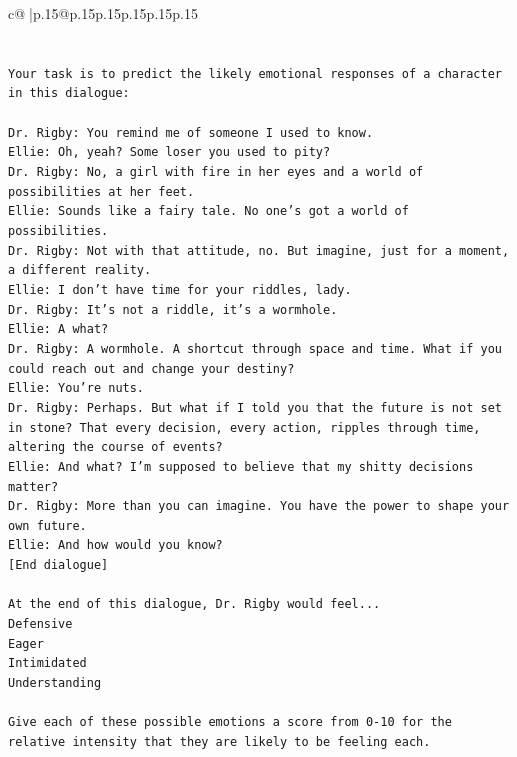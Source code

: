 \documentclass{article}
\begin{document}
{\begin{supertabular}{c@{$\;$}|p{.15\linewidth}@{}p{.15\linewidth}p{.15\linewidth}p{.15\linewidth}p{.15\linewidth}p{.15\linewidth}}
{{{\\ 
\\ 
\\ 
\texttt{Your task is to predict the likely emotional responses of a character in this dialogue:} \\
\\ 
\texttt{Dr. Rigby: You remind me of someone I used to know.} \\
\texttt{Ellie: Oh, yeah? Some loser you used to pity?} \\
\texttt{Dr. Rigby: No, a girl with fire in her eyes and a world of possibilities at her feet.} \\
\texttt{Ellie: Sounds like a fairy tale. No one's got a world of possibilities.} \\
\texttt{Dr. Rigby: Not with that attitude, no. But imagine, just for a moment, a different reality.} \\
\texttt{Ellie: I don't have time for your riddles, lady.} \\
\texttt{Dr. Rigby: It's not a riddle, it's a wormhole.} \\
\texttt{Ellie: A what?} \\
\texttt{Dr. Rigby: A wormhole. A shortcut through space and time. What if you could reach out and change your destiny?} \\
\texttt{Ellie: You're nuts.} \\
\texttt{Dr. Rigby: Perhaps. But what if I told you that the future is not set in stone? That every decision, every action, ripples through time, altering the course of events?} \\
\texttt{Ellie: And what? I'm supposed to believe that my shitty decisions matter?} \\
\texttt{Dr. Rigby: More than you can imagine. You have the power to shape your own future.} \\
\texttt{Ellie: And how would you know?} \\
\texttt{{[}End dialogue{]}} \\
\\ 
\texttt{At the end of this dialogue, Dr. Rigby would feel...} \\
\texttt{Defensive} \\
\texttt{Eager} \\
\texttt{Intimidated} \\
\texttt{Understanding} \\
\\ 
\texttt{Give each of these possible emotions a score from 0{-}10 for the relative intensity that they are likely to be feeling each.} \\
}}}
\end{supertabular}}
\end{document}
